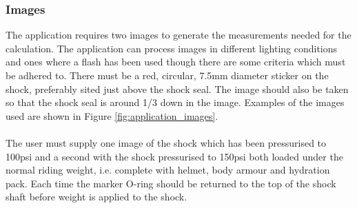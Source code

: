 		\subsubsection{Images}
			The application requires two images to generate the measurements needed for the calculation. The application can process images in different lighting conditions and ones where a flash has been used though there are some criteria which must be adhered to. There must be a red, circular, 7.5mm diameter sticker on the shock, preferably sited just above the shock seal. The image should also be taken so that the shock seal is around 1/3 down in the image. Examples of the images used are shown in Figure \ref{fig:application_images}.
			\\\\
			The user must supply one image of the shock which has been pressurised to 100psi and a second with the shock pressurised to 150psi both loaded under the normal riding weight, i.e. complete with helmet,  body armour and hydration pack. Each time the marker O-ring should be returned to the top of the shock shaft before weight is applied to the shock.
